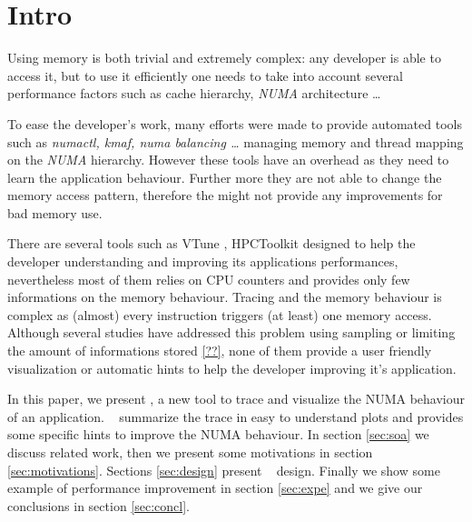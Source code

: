 \section{Intro}
\label{sec:intro}

Using memory is both trivial and extremely complex: any developer is able to
access it, but to use it efficiently one needs to take into account several
performance factors such as cache hierarchy, \emph{NUMA} architecture
\cite{Drepper07What} \ldots

To ease the developer's work, many efforts were made to provide automated
tools such as \emph{numactl, kmaf, numa balancing \ldots}
managing memory and thread mapping on the \emph{NUMA} hierarchy. However these
tools have an overhead as they need to learn the application behaviour.
Further more they are not able to change the memory access pattern, therefore
the might not provide any improvements for bad memory use.

There are several tools such as VTune \cite{Reinders05VTune},
HPCToolkit\cite{Adhianto10HPCTOOLKIT}  designed to help the
developer understanding and improving its applications performances,
nevertheless most of them relies on CPU counters and provides only few
informations on the memory behaviour. Tracing and the memory behaviour is
complex as (almost) every instruction triggers (at least) one memory access.
Although several studies have addressed this problem using sampling
\cite{Lachaize12MemProf} or limiting the amount of informations stored
\ref{??}, none of them provide a user friendly visualization or automatic hints
to help the developer improving it's application.


In this paper, we present \TABARNAC, a new tool to trace and visualize the
NUMA behaviour of an application. \TABARNAC~ summarize the trace in easy to
understand plots and provides some specific hints to improve the NUMA
behaviour. In section \ref{sec:soa} we discuss related work, then we present
some motivations in section \ref{sec:motivations}. Sections \ref{sec:design}
present \TABARNAC~ design. Finally we show some example of performance
improvement in section \ref{sec:expe} and we give our conclusions in section
\ref{sec:concl}.
